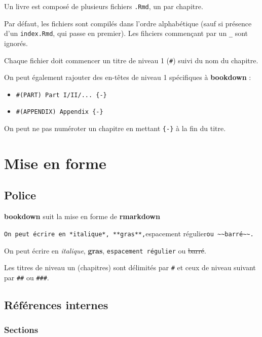 \documentclass[]{book}
\theoremstyle{definition}
\theoremstyle{definition}
\theoremstyle{definition}
\theoremstyle{remark}
\begin{document}
Un livre est composé de plusieurs fichiers \texttt{.Rmd}, un par chapitre.

Par défaut, les fichiers sont compilés dans l'ordre alphabétique (sauf si présence d'un \texttt{index.Rmd}, qui passe en premier). Les fihciers commençant par un \texttt{\_} sont ignorés.

Chaque fichier doit commencer un titre de niveau 1 (\texttt{\#}) suivi du nom du chapitre.

On peut également rajouter des en-têtes de niveau 1 spécifiques à \textbf{bookdown} :

\begin{itemize}
\item
  \texttt{\#(PART)\ Part\ I/II/...\ \{-\}}
\item
  \texttt{\#(APPENDIX)\ Appendix\ \{-\}}
\end{itemize}

On peut ne pas numéroter un chapitre en mettant \texttt{\{-\}} à la fin du titre.

\hypertarget{mise-en-forme}{%
\chapter{Mise en forme}\label{mise-en-forme}}

\hypertarget{police}{%
\section{Police}\label{police}}

\textbf{bookdown} suit la mise en forme de \textbf{rmarkdown}

\texttt{On\ peut\ écrire\ en\ *italique*,\ **gras**,}espacement régulier\texttt{ou\ \textasciitilde{}\textasciitilde{}barré\textasciitilde{}\textasciitilde{}.}

On peut écrire en \emph{italique}, \textbf{gras}, \texttt{espacement\ régulier} ou \sout{barré}.

Les titres de niveau un (chapitres) sont délimités par \texttt{\#} et ceux de niveau suivant par \texttt{\#\#} ou \texttt{\#\#\#}.

\hypertarget{refint}{%
\section{Références internes}\label{refint}}

\hypertarget{sections}{%
\subsection{Sections}\label{sections}}
\end{document}
